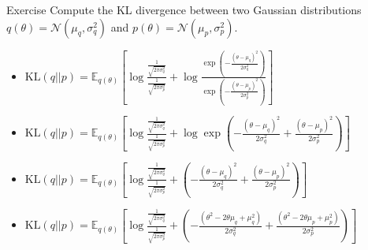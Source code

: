 \documentclass{beamer}
\begin{document}
\begin{frame}{Exercise}
    Compute the KL divergence between two Gaussian distributions $q(\theta) = \mathcal{N}(\mu_q, \sigma_q^2)$ and $p(\theta) = \mathcal{N}(\mu_p, \sigma_p^2)$.

    \begin{itemize}
        \item \pause $\text{KL}(q||p) = \mathbb{E}_{q(\theta)} \left[ \log \frac{\frac{1}{\sqrt{2\pi\sigma_q^2}}}{\frac{1}{\sqrt{2\pi\sigma_p^2}}} + \log \frac{\exp \left( -\frac{(\theta - \mu_q)^2}{2\sigma_q^2} \right)}{\exp \left( -\frac{(\theta - \mu_p)^2}{2\sigma_p^2} \right)} \right]$
        \item \pause $\text{KL}(q||p) = \mathbb{E}_{q(\theta)} \left[ \log \frac{\frac{1}{\sqrt{2\pi\sigma_q^2}}}{\frac{1}{\sqrt{2\pi\sigma_p^2}}} + \log \exp \left( -\frac{(\theta - \mu_q)^2}{2\sigma_q^2} + \frac{(\theta - \mu_p)^2}{2\sigma_p^2} \right) \right]$
        \item \pause $\text{KL}(q||p) = \mathbb{E}_{q(\theta)} \left[ \log \frac{\frac{1}{\sqrt{2\pi\sigma_q^2}}}{\frac{1}{\sqrt{2\pi\sigma_p^2}}} + \left( -\frac{(\theta - \mu_q)^2}{2\sigma_q^2} + \frac{(\theta - \mu_p)^2}{2\sigma_p^2} \right) \right]$
        \item \pause $\text{KL}(q||p) = \mathbb{E}_{q(\theta)} \left[ \log \frac{\frac{1}{\sqrt{2\pi\sigma_q^2}}}{\frac{1}{\sqrt{2\pi\sigma_p^2}}} + \left( -\frac{(\theta^2 - 2\theta\mu_q + \mu_q^2)}{2\sigma_q^2} + \frac{(\theta^2 - 2\theta\mu_p + \mu_p^2)}{2\sigma_p^2} \right) \right]$
    \end{itemize}

    
\end{frame}
\end{document}
